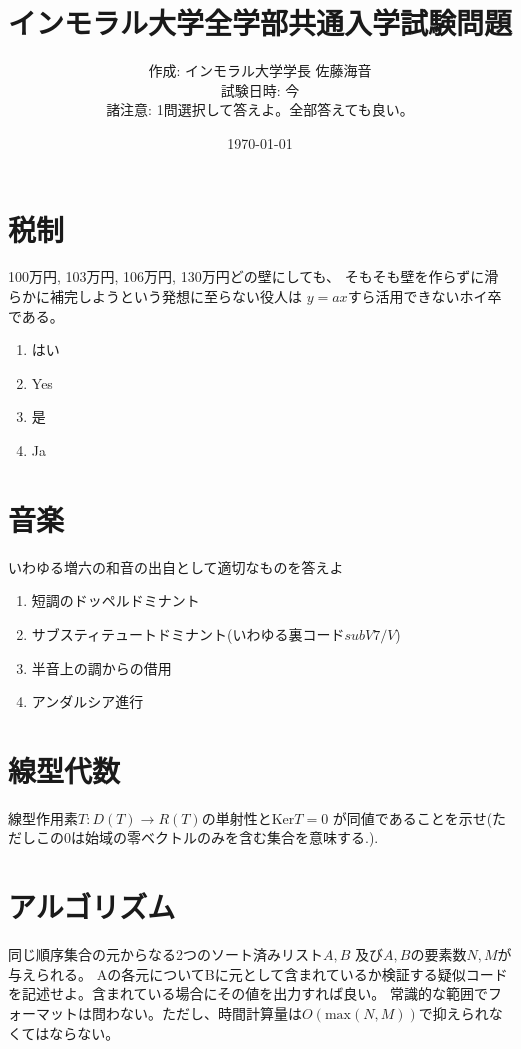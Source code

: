 \documentclass[uplatex]{jsarticle}
\title{インモラル大学全学部共通入学試験問題}
\author{
    作成: インモラル大学学長 佐藤海音 \\
    試験日時: 今 \\
    諸注意: 1問選択して答えよ。全部答えても良い。
}
\date{\today}
\begin{document}
\maketitle
\newpage


\section{税制}
100万円, 103万円, 106万円, 130万円どの壁にしても、
そもそも壁を作らずに滑らかに補完しようという発想に至らない役人は
$y=ax$すら活用できないホイ卒である。
\begin{enumerate}
    \item はい
    \item Yes
    \item 是
    \item Ja
\end{enumerate}

\section{音楽}
いわゆる増六の和音の出自として適切なものを答えよ
\begin{enumerate}
    \item 短調のドッペルドミナント
    \item サブスティテュートドミナント(いわゆる裏コード$subV7/V$)
    \item 半音上の調からの借用
    \item アンダルシア進行
\end{enumerate}

\section{線型代数}
線型作用素$T:D(T)\rightarrow R(T)$の単射性と$\mbox{Ker}T=0$
が同値であることを示せ(ただしこの0は始域の零ベクトルのみを含む集合を意味する.).

\section{アルゴリズム}
同じ順序集合の元からなる2つのソート済みリスト$A,B$ 及び$A,B$の要素数$N,M$が与えられる。
Aの各元についてBに元として含まれているか検証する疑似コードを記述せよ。含まれている場合にその値を出力すれば良い。
常識的な範囲でフォーマットは問わない。ただし、時間計算量は$O(\mbox{max}(N,M))$で抑えられなくてはならない。


\newpage
\end{document}
